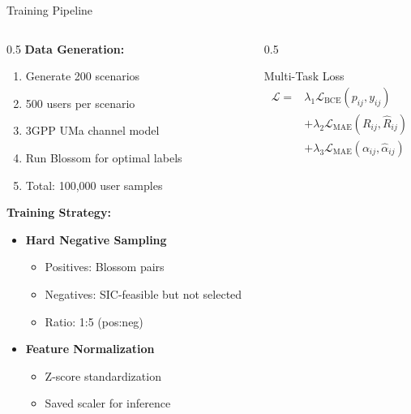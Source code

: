 \documentclass[aspectratio=169]{beamer}
\begin{document}
\begin{frame}{Training Pipeline}
    \begin{columns}
        \begin{column}{0.5\textwidth}
            \textbf{Data Generation:}
            \begin{enumerate}
                \item Generate 200 scenarios
                \item 500 users per scenario
                \item 3GPP UMa channel model
                \item Run Blossom for optimal labels
                \item Total: 100,000 user samples
            \end{enumerate}
            
            \vspace{0.3cm}
            
            \textbf{Training Strategy:}
            \begin{itemize}
                \item \textbf{Hard Negative Sampling}
                \begin{itemize}
                    \item Positives: Blossom pairs
                    \item Negatives: SIC-feasible but not selected
                    \item Ratio: 1:5 (pos:neg)
                \end{itemize}
                
                \item \textbf{Feature Normalization}
                \begin{itemize}
                    \item Z-score standardization
                    \item Saved scaler for inference
                \end{itemize}
            \end{itemize}
        \end{column}
        \begin{column}{0.5\textwidth}
            \begin{block}{Multi-Task Loss}
                \begin{align*}
                    \mathcal{L} = &\lambda_1 \mathcal{L}_{\text{BCE}}(p_{ij}, y_{ij}) \\
                    &+ \lambda_2 \mathcal{L}_{\text{MAE}}(R_{ij}, \hat{R}_{ij}) \\
                    &+ \lambda_3 \mathcal{L}_{\text{MAE}}(\alpha_{ij}, \hat{\alpha}_{ij})
                \end{align*}
                

\end{block}
\end{column}
\end{columns}
\end{frame}
\end{document}
